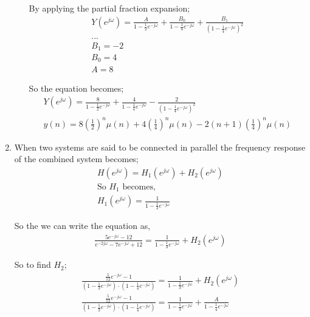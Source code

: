 \documentclass[10pt,a4paper, margin=1in]{article}
\begin{document}
\begin{enumerate}
\begin{enumerate}
    By applying the partial fraction expansion;
    \begin{align*}
        Y(e^{j\omega}) = \frac{A}{1 - \frac{1}{2}e^{-j\omega}} + \frac{B_0}{1 - \frac{1}{4}e^{-j\omega}} + \frac{B_1}{(1 - \frac{1}{4}e^{-j\omega})^2} \\
        ... \\
        B_1 = -2 \\
        B_0 = 4 \\
        A = 8
    \end{align*}
    
    So the equation becomes;
    \begin{align*}
        Y(e^{j\omega}) = \frac{8}{1 - \frac{1}{2}e^{-j\omega}} + \frac{4}{1 - \frac{1}{4}e^{-j\omega}} - \frac{2}{(1 - \frac{1}{4}e^{-j\omega})^2} \\
        y(n) = 8 (\frac{1}{2})^n \mu(n) + 4 (\frac{1}{4})^n \mu(n) - 2 (n+1) (\frac{1}{4})^n \mu(n) 
    \end{align*}
    
    \end{enumerate}

\item %
When two systems are said to be connected in parallel the frequency response of the combined system becomes;
\begin{align*}
    H(e^{j\omega}) = H_{1}(e^{j\omega}) + H_{2}(e^{j\omega}) \\ 
    \text{So $H_1$ becomes,} \\
    H_{1}(e^{j\omega}) = \frac{1}{1 - \frac{1}{3}e^{-j\omega}}
\end{align*}

So the we can write the equation as,
\begin{align*}
    \frac{5e^{-j\omega} - 12}{e^{-2j\omega} - 7e^{-j\omega} + 12} = \frac{1}{1 - \frac{1}{3}e^{-j\omega}} + H_{2}(e^{j\omega})
\end{align*}

So to find $H_2$;
\begin{align*}
    \frac{\frac{5}{12} e^{-j\omega} - 1}{(1 - \frac{1}{3}e^{-j\omega}) \cdot (1 - \frac{1}{4}e^{-j\omega})} = \frac{1}{1 - \frac{1}{3}e^{-j\omega}} + H_{2}(e^{j\omega}) \\
    \frac{\frac{5}{12} e^{-j\omega} - 1}{(1 - \frac{1}{3}e^{-j\omega}) \cdot (1 - \frac{1}{4}e^{-j\omega})} = \frac{1}{1 - \frac{1}{3}e^{-j\omega}} + \frac{A}{1 - \frac{1}{4}e^{-j\omega}}
\end{align*}


\end{enumerate}
\end{document}
